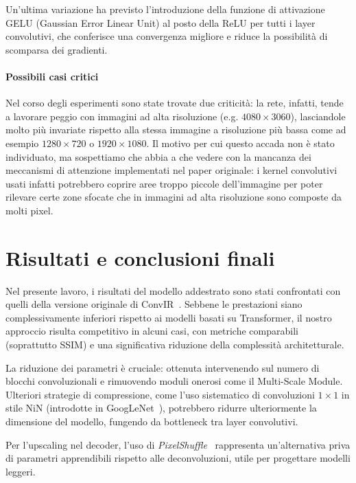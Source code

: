 \documentclass[a4paper,10pt,twocolumn]{article}
\begin{document}
Un'ultima variazione ha previsto l'introduzione della funzione di attivazione GELU (Gaussian Error Linear Unit) al posto della ReLU per tutti i layer convolutivi, che conferisce una convergenza migliore e riduce la 
possibilità di scomparsa dei gradienti.

\paragraph{Possibili casi critici}
Nel corso degli esperimenti sono state trovate due criticità: la rete, infatti, tende a lavorare peggio con immagini ad alta risoluzione (e.g. $4080\times3060$), lasciandole molto più invariate rispetto alla stessa immagine a risoluzione più bassa come ad esempio $1280\times720$ o $1920\times1080$.
 Il motivo per cui questo accada non è stato individuato, ma sospettiamo che abbia a che vedere con la mancanza dei meccanismi di attenzione implementati nel paper originale: i kernel convolutivi usati infatti potrebbero coprire aree troppo piccole dell'immagine 
 per poter rilevare certe zone sfocate che in immagini ad alta risoluzione sono composte da molti pixel.

\section{Risultati e conclusioni finali}\label{results}

Nel presente lavoro, i risultati del modello addestrato sono stati confrontati con quelli della versione originale di ConvIR~\cite{convir}. Sebbene le prestazioni siano complessivamente inferiori rispetto ai modelli basati su Transformer, il nostro approccio risulta competitivo in alcuni casi, con metriche comparabili (soprattutto SSIM) e una significativa riduzione della complessità architetturale.

La riduzione dei parametri è cruciale: ottenuta intervenendo sul numero di blocchi convoluzionali e rimuovendo moduli onerosi come il Multi-Scale Module. Ulteriori strategie di compressione, come l'uso sistematico di convoluzioni $1 \times 1$ in stile NiN (introdotte in GoogLeNet~\cite{szegedy2014goingdeeperconvolutions}), potrebbero ridurre ulteriormente la dimensione del modello, fungendo da bottleneck tra layer convolutivi.

Per l'upscaling nel decoder, l'uso di \textit{PixelShuffle}~\cite{zamzam2025pixelshufflersimpleimagetranslation} rappresenta un'alternativa priva di parametri apprendibili rispetto alle deconvoluzioni, utile per progettare modelli leggeri.
\end{document}
